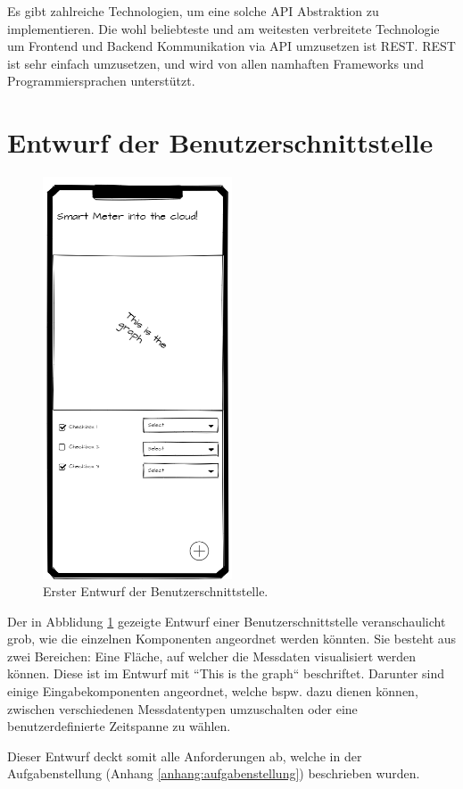 Es gibt zahlreiche Technologien, um eine solche \ac{API} Abstraktion zu implementieren.
Die wohl beliebteste und am weitesten verbreitete Technologie um Frontend und Backend
Kommunikation via \ac{API} umzusetzen ist \ac{REST}.
\ac{REST} ist sehr einfach umzusetzen, und wird von allen namhaften Frameworks und
Programmiersprachen unterstützt.

\section{Entwurf der Benutzerschnittstelle}
\label{konzepte:entwurf-benutzerschnittstelle}
\begin{figure}[h]
    \centering
    \includegraphics[width=0.5\textwidth]{gfx/entwurf_ui.png}
    \caption{
        Erster Entwurf der Benutzerschnittstelle.
    }
    \label{fig:entwurf_ui}
\end{figure}
Der in Abblidung \ref{fig:entwurf_ui} gezeigte Entwurf einer Benutzerschnittstelle
veranschaulicht grob, wie die einzelnen Komponenten angeordnet werden könnten.
Sie besteht aus zwei Bereichen: Eine Fläche, auf welcher die Messdaten visualisiert werden können.
Diese ist im Entwurf mit ``This is the graph`` beschriftet.
Darunter sind einige Eingabekomponenten angeordnet, welche bspw. dazu dienen können,
zwischen verschiedenen Messdatentypen umzuschalten oder eine benutzerdefinierte Zeitspanne
zu wählen.

Dieser Entwurf deckt somit alle Anforderungen ab, welche in der Aufgabenstellung (Anhang \ref{anhang:aufgabenstellung}) beschrieben wurden.


